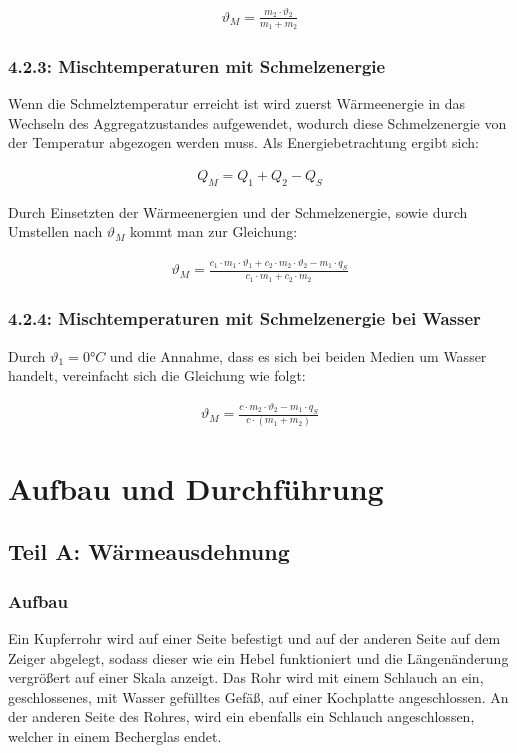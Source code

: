 \documentclass[a4paper]{scrartcl}
\numberwithin{equation}{subsection}
\begin{document}
\begin{align}
\vartheta_M = \frac{m_2 \cdot \vartheta_2}{m_1 + m_2}
\end{align}

\subsubsection{4.2.3: Mischtemperaturen mit Schmelzenergie}

Wenn die Schmelztemperatur erreicht ist wird zuerst Wärmeenergie in das Wechseln des Aggregatzustandes aufgewendet, wodurch diese Schmelzenergie von der Temperatur abgezogen werden muss. Als Energiebetrachtung ergibt sich:

\begin{align}
Q_M = Q_1 + Q_2 - Q_S
\end{align}

Durch Einsetzten der Wärmeenergien und der Schmelzenergie, sowie durch Umstellen nach $\vartheta_M$ kommt man zur Gleichung:

\begin{align}
\vartheta_M = \frac{c_1 \cdot m_1 \cdot \vartheta_1 + c_2 \cdot m_2 \cdot \vartheta_2 - m_1 \cdot q_S}{c_1 \cdot m_1 + c_2 \cdot m_2}
\end{align}

\subsubsection{4.2.4: Mischtemperaturen mit Schmelzenergie bei Wasser}

Durch $\vartheta_1 = 0°C$ und die Annahme, dass es sich bei beiden Medien um Wasser handelt, vereinfacht sich die Gleichung wie folgt:

\begin{align}
\vartheta_M = \frac{c \cdot m_2 \cdot \vartheta_2 - m_1 \cdot q_S}{c \cdot (m_1 + m_2)}
\end{align}

\newpage
\section{Aufbau und Durchführung}
\subsection{Teil A: Wärmeausdehnung}
\subsubsection{Aufbau}
Ein Kupferrohr wird auf einer Seite befestigt und auf der anderen Seite auf dem Zeiger abgelegt, sodass dieser wie ein Hebel funktioniert und die Längenänderung vergrößert auf einer Skala anzeigt.
Das Rohr wird mit einem Schlauch an ein, geschlossenes, mit Wasser gefülltes Gefäß, auf einer Kochplatte angeschlossen. An der anderen Seite des Rohres, wird ein ebenfalls ein Schlauch angeschlossen, welcher in einem Becherglas endet.
\end{document}
